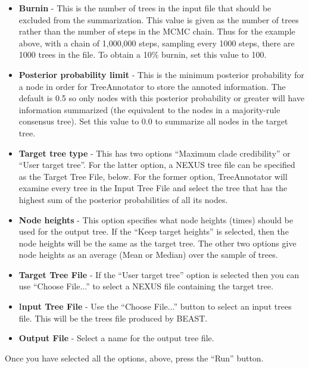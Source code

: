 \documentclass[11pt]{article}
\begin{document}
\begin{itemize}
\item {\bf Burnin} - This is the number of trees in the input file that should be excluded from the summarization. This value is given
as the number of trees rather than the number of steps in the MCMC chain. Thus for the example above, with a chain of
1,000,000 steps, sampling every 1000 steps, there are 1000 trees in the file. To obtain a 10\% burnin, set this value to
100.
\item {\bf Posterior probability limit} - This is the minimum posterior probability for a node in order for TreeAnnotator to store the
annoted information. The default is 0.5 so only nodes with this posterior probability or greater will have information
summarized (the equivalent to the nodes in a majority-rule consensus tree). Set this value to 0.0 to summarize all nodes in
the target tree.
\item {\bf Target tree type} - This has two options ``Maximum clade credibility'' or ``User target tree''. For the latter option, a
NEXUS tree file can be specified as the Target Tree File, below. For the former option, TreeAnnotator will examine every
tree in the Input Tree File and select the tree that has the highest sum of the posterior probabilities of all its nodes.
\item {\bf Node heights} - This option specifies what node heights (times) should be used for the output tree. If the ``Keep target
heights'' is selected, then the node heights will be the same as the target tree. The other two options give node heights
as an average (Mean or Median) over the sample of trees.
\item {\bf Target Tree File} - If the ``User target tree'' option is selected then you can use ``Choose File...'' to select a NEXUS file
containing the target tree.
\item I{\bf nput Tree File} - Use the ``Choose File...'' button to select an input trees file. This will be the trees file produced by
BEAST.
\item {\bf Output File} - Select a name for the output tree file.
\end{itemize}

Once you have selected all the options, above, press the ``Run'' button. 
\end{document}
